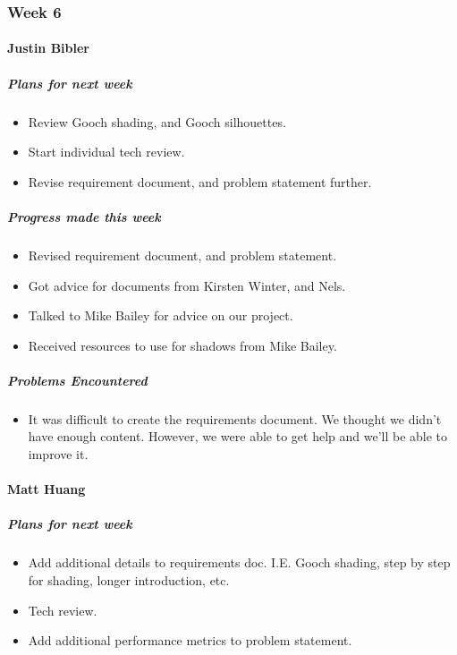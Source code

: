 {
\subsubsection{Week 6}
\paragraph{Justin Bibler}
\subparagraph{Plans for next week}
\begin{itemize}
  \item Review Gooch shading, and Gooch silhouettes.
  \item Start individual tech review.
  \item Revise requirement document, and problem statement further.
\end{itemize}

\subparagraph{Progress made this week}
\begin{itemize}
  \item Revised requirement document, and problem statement.
  \item Got advice for documents from Kirsten Winter, and Nels.
  \item Talked to Mike Bailey for advice on our project.
  \item Received resources to use for shadows from Mike Bailey.
\end{itemize}

\subparagraph{Problems Encountered}
\begin{itemize}
  \item It was difficult to create the requirements document. We thought we didn't have enough content. However, we were able to get help and we'll be able to improve it.
\end{itemize}

\vspace{3mm}

\paragraph{Matt Huang}
\subparagraph{Plans for next week}
\begin{itemize}
  \item Add additional details to requirements doc. I.E. Gooch shading, step by step for shading, longer introduction, etc.
  \item Tech review.
  \item Add additional performance metrics to problem statement.
\end{itemize}

}
